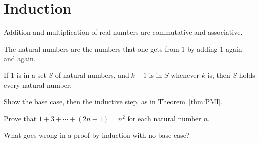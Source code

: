 \chapter{Induction}\label{chap:Induction}

\begin{fieldaxioms}
Addition and multiplication of real numbers are commutative and associative.
\end{fieldaxioms}

\begin{intuitivedef}\label{def:natural}
The natural numbers are the numbers that one gets from $1$ by adding $1$
again and again.
\end{intuitivedef}

\begin{theorem}\label{thm:PMI}
If $1$ is in a set $S$ of natural numbers, and $k+1$ is in $S$ whenever $k$
is, then $S$ holds every natural number.
\end{theorem}

\begin{skeleton}
Show the base case, then the inductive step, as in Theorem~\ref{thm:PMI}.
\end{skeleton}

\begin{problem}
Prove that $1 + 3 + \cdots + (2n-1) = n^2$ for each natural number $n$.
\end{problem}

\begin{question}
What goes wrong in a proof by induction with no base case?
\end{question}
